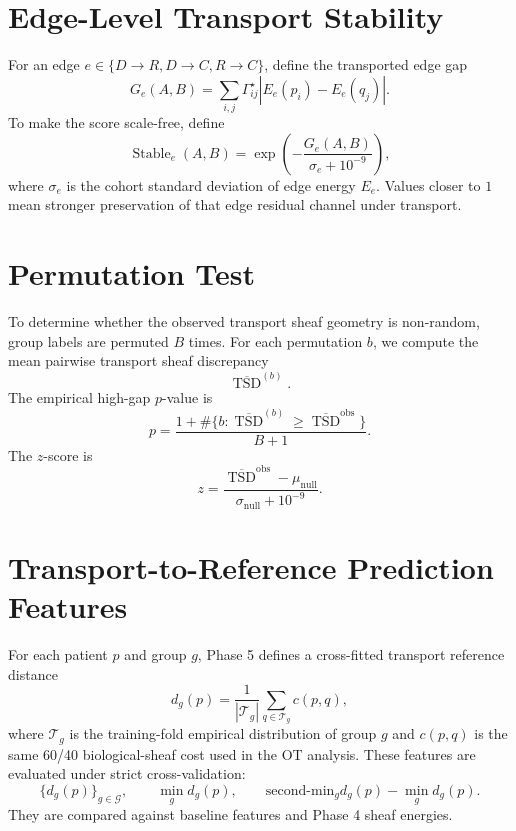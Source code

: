 \documentclass[11pt]{article}
\begin{document}
\section{Edge-Level Transport Stability}
For an edge $e\in\{D\to R,D\to C,R\to C\}$, define the transported edge gap
\begin{equation}
G_e(A,B)=\sum_{i,j}\Gamma^{\star}_{ij}\left|E_e(p_i)-E_e(q_j)\right|.
\end{equation}
To make the score scale-free, define
\begin{equation}
\operatorname{Stable}_e(A,B)=\exp\left(-\frac{G_e(A,B)}{\sigma_e+10^{-9}}\right),
\end{equation}
where $\sigma_e$ is the cohort standard deviation of edge energy $E_e$.  Values closer to $1$ mean stronger preservation of that edge residual channel under transport.

\section{Permutation Test}
To determine whether the observed transport sheaf geometry is non-random, group labels are permuted $B$ times.  For each permutation $b$, we compute the mean pairwise transport sheaf discrepancy
\begin{equation}
\overline{\operatorname{TSD}}^{(b)}.
\end{equation}
The empirical high-gap $p$-value is
\begin{equation}
 p=\frac{1+\#\{b:\overline{\operatorname{TSD}}^{(b)}\ge \overline{\operatorname{TSD}}^{\mathrm{obs}}\}}{B+1}.
\end{equation}
The $z$-score is
\begin{equation}
 z=\frac{\overline{\operatorname{TSD}}^{\mathrm{obs}}-\mu_{\mathrm{null}}}{\sigma_{\mathrm{null}}+10^{-9}}.
\end{equation}

\section{Transport-to-Reference Prediction Features}
For each patient $p$ and group $g$, Phase 5 defines a cross-fitted transport reference distance
\begin{equation}
 d_g(p)=\frac{1}{|\mathcal T_g|}\sum_{q\in\mathcal T_g}c(p,q),
\end{equation}
where $\mathcal T_g$ is the training-fold empirical distribution of group $g$ and $c(p,q)$ is the same 60/40 biological-sheaf cost used in the OT analysis.  These features are evaluated under strict cross-validation:
\begin{equation}
\{d_g(p)\}_{g\in\mathcal G},\qquad
\min_g d_g(p),\qquad
\text{second-min}_g d_g(p)-\min_g d_g(p).
\end{equation}
They are compared against baseline features and Phase 4 sheaf energies.
\end{document}
